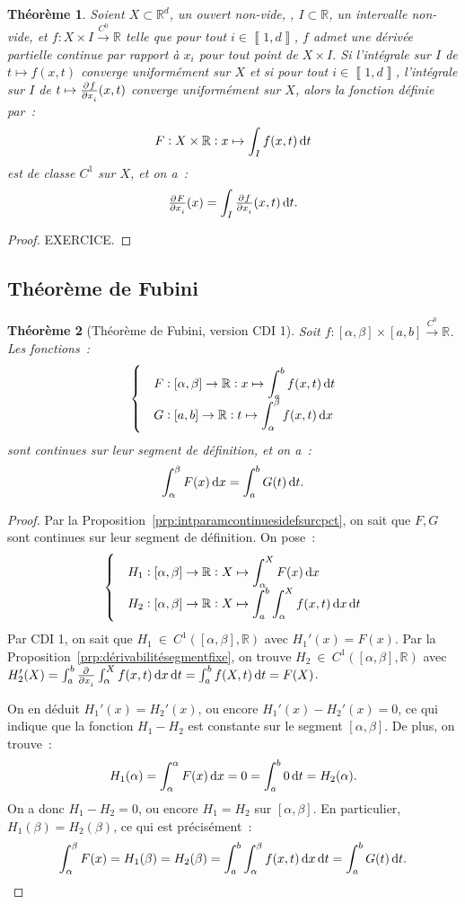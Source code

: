 \documentclass{report}
\newtheorem{thm}{Théorème}[chapter]
\theoremstyle{definition}
\theoremstyle{remark}
\newcommand{\R}{\mathbb R}
\newcommand{\intint}[2]{\left\llbracket#1, #2\right\rrbracket}
\newcommand{\toC}[1]{\xrightarrow{C^{#1}}}
\newcommand{\tocont}{\toC 0}
\newcommand{\CDII}{{CDI 1}}
\begin{document}
			\begin{thm} Soient $X \subset \R^d$, un ouvert non-vide, , $I \subset \R$, un intervalle non-vide, et $f : X \times I \tocont \R$ telle que pour
			tout $i \in \intint 1d$, $f$ admet une dérivée partielle continue par rapport à $x_i$ pour tout point de $X \times I$. Si l'intégrale sur $I$ de
			$t \mapsto f(x, t)$ converge uniformément sur $X$ et si pour tout $i \in \intint 1d$, l'intégrale sur $I$ de $t \mapsto \pd f{x_i}(x, t)$ converge
			uniformément sur $X$, alors la fonction définie par~:
			\[F : X \times \R : x \mapsto \int_If(x, t)\dif t\]
			est de classe $C^1$ sur $X$, et on a~:
			\[\pd F{x_i}(x) = \int_I\pd f{x_i}(x, t)\dif t.\]
			\end{thm}

			\begin{proof} EXERCICE.
			\end{proof}

		\subsection{Théorème de Fubini}
			\begin{thm}[Théorème de Fubini, version \CDII] Soit $f : [\alpha, \beta] \times [a, b] \tocont \R$. Les fonctions~:
			\[
				\begin{cases}
					&\displaystyle F : [\alpha, \beta] \to \R : x \mapsto \int_a^bf(x, t)\dif t \\
					&\displaystyle G : [a, b] \to \R : t \mapsto \int_\alpha^\beta f(x, t)\dif x
				\end{cases}
			\]
			sont continues sur leur segment de définition, et on a~:
			\[\int_\alpha^\beta F(x)\dif x = \int_a^b G(t)\dif t.\]
			\end{thm}

			\begin{proof} Par la Proposition~\ref{prp:intparamcontinuesidefsurcpct}, on sait que $F, G$ sont continues sur leur segment de définition. On pose~:
			\[
				\begin{cases}
					&\displaystyle H_1 : [\alpha, \beta] \to \R : X \mapsto \int_\alpha^X F(x)\dif x \\
					&\displaystyle H_2 : [\alpha, \beta] \to \R : X \mapsto \int_a^b\int_\alpha^X f(x, t)\dif x\dif t
				\end{cases}
			\]
			Par \CDII, on sait que $H_1~\in~C^1([\alpha, \beta], \R)$ avec $H_1'(x) = F(x)$. Par la Proposition~\ref{prp:dérivabilitésegmentfixe}, on trouve
			$H_2~\in~C^1([\alpha, \beta], \R)$ avec $H_2'(X) = \int_a^b\pd {}{x_i}\int_\alpha^X f(x, t)\dif x\dif t = \int_a^b f(X, t)\dif t = F(X)$.

			On en déduit $H_1'(x) = H_2'(x)$, ou encore $H_1'(x)-H_2'(x) = 0$, ce qui indique que la fonction $H_1-H_2$ est constante sur le segment
			$[\alpha, \beta]$. De plus, on trouve~:
			\[H_1(\alpha) = \int_\alpha^\alpha F(x)\dif x = 0 = \int_a^b0\dif t = H_2(\alpha).\]
			On a donc $H_1-H_2 = 0$, ou encore $H_1=H_2$ sur $[\alpha, \beta]$. En particulier, $H_1(\beta) = H_2(\beta)$, ce qui est précisément~:
			\[\int_\alpha^\beta F(x) = H_1(\beta) = H_2(\beta) = \int_a^b\int_\alpha^\beta f(x, t)\dif x\dif t = \int_a^b G(t)\dif t.\]
			\end{proof}
\end{document}
